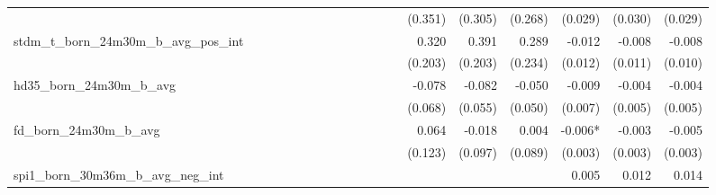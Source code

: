 \begin{tabular}{lrrrrrrrrrrrrrrrrrr}
                                            &              &              &              &              &              &              &              &              &               &              &              &               &      (0.351) &      (0.305) &       (0.268) &      (0.029) &      (0.030) &       (0.029) \\ 
stdm\_t\_born\_24m30m\_b\_avg\_pos\_int     &              &              &              &              &              &              &              &              &               &              &              &               &        0.320 &        0.391 &         0.289 &       -0.012 &       -0.008 &        -0.008 \\ 
                                            &              &              &              &              &              &              &              &              &               &              &              &               &      (0.203) &      (0.203) &       (0.234) &      (0.012) &      (0.011) &       (0.010) \\ 
hd35\_born\_24m30m\_b\_avg                  &              &              &              &              &              &              &              &              &               &              &              &               &       -0.078 &       -0.082 &        -0.050 &       -0.009 &       -0.004 &        -0.004 \\ 
                                            &              &              &              &              &              &              &              &              &               &              &              &               &      (0.068) &      (0.055) &       (0.050) &      (0.007) &      (0.005) &       (0.005) \\ 
fd\_born\_24m30m\_b\_avg                    &              &              &              &              &              &              &              &              &               &              &              &               &        0.064 &       -0.018 &         0.004 &      -0.006* &       -0.003 &        -0.005 \\ 
                                            &              &              &              &              &              &              &              &              &               &              &              &               &      (0.123) &      (0.097) &       (0.089) &      (0.003) &      (0.003) &       (0.003) \\ 
spi1\_born\_30m36m\_b\_avg\_neg\_int        &              &              &              &              &              &              &              &              &               &              &              &               &              &              &               &        0.005 &        0.012 &         0.014 \\ 

\end{tabular}
